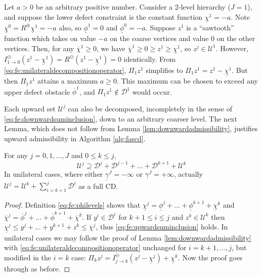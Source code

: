 \documentclass[review,hidelinks,onefignum,onetabnum]{siamart220329}
\newcommand{\maxR}{R^{\bm{\oplus}}}
\newcommand{\minR}{R^{\bm{\ominus}}}
\begin{document}
\begin{example}  \label{ex:notfullcd}
Let $a > 0$ be an arbitrary positive number.  Consider a 2-level hierarchy ($J=1$), and suppose the lower defect constraint is the constant function $\underline{\chi}^1=-a$.  Note $\underline{\chi}^0=\maxR \underline{\chi}^1=-a$ also, so $\underline{\phi}^1=0$ and $\underline{\phi}^0=-a$.  Suppose $z^1$ is a ``sawtooth'' function which takes on value $-a$ on the coarse vertices and value $0$ on the other vertices.  Then, for any $\overline{\chi}^1\ge 0$, we have $\overline{\chi}^1 \ge 0 \ge z^1\ge \underline{\chi}^1$, so $z^j \in \mathcal{U}^1$.  However, $I_{1\to 0}^\ominus(z^1 - \underline{\chi}^1) = \minR(z^1 - \underline{\chi}^1) = 0$ identically.  From \eqref{eq:fe:unilateraldecompositionoperator}, $\Pi_1 z^1$ simplifies to $\Pi_1 z^1 = z^1 - \underline{\chi}^1$.  But then $\Pi_1 z^1$ attains a maximum $a\ge 0$.  This maximum can be chosen to exceed any upper defect obstacle $\overline{\phi}^1$, and $\Pi_1 z^1 \notin \mathcal{D}^1$ would occur.
\end{example}

Each upward set $\mathcal{U}^j$ can also be decomposed, incompletely in the sense of \eqref{eq:fe:downwardsuminclusion}, down to an arbitrary coarser level.  The next Lemma, which does not follow from Lemma \ref{lem:downwardadmissibility}, justifies upward admissibility in Algorithm \ref{alg:fascd}.

\begin{lemma}  \label{lem:upwardadmissibility}  For any $j=0,1,\dots,J$ and $0\le k\le j$,
\begin{equation}
\mathcal{U}^j \supseteq \mathcal{D}^j + \mathcal{D}^{j-1} + \dots + \mathcal{D}^{k+1} + \mathcal{U}^k \label{eq:fe:upwardsuminclusion}
\end{equation}
In unilateral cases, where either $\underline{\gamma}^J=-\infty$ or $\overline{\gamma}^J=+\infty$, actually $\mathcal{U}^j = \mathcal{U}^k + \sum_{i=k+1}^j \mathcal{D}^i$ as a full CD. \end{lemma}

\begin{proof}  Definition \eqref{eq:fe:philevels} shows that $\underline{\chi}^j = \underline{\phi}^j + \dots + \underline{\phi}^{k+1} + \underline{\chi}^k$ and $\overline{\chi}^j = \overline{\phi}^j + \dots + \overline{\phi}^{k+1} + \overline{\chi}^k$.  If $y^i \in \mathcal{D}^i$ for $k+1 \le i \le j$ and $z^k \in \mathcal{U}^k$ then $\underline{\chi}^j \le y^j + \dots + y^{k+1} + z^k \le \overline{\chi}^j$, thus \eqref{eq:fe:upwardsuminclusion} holds.  In unilateral cases we may follow the proof of Lemma \ref{lem:downwardadmissibility} with \eqref{eq:fe:unilateraldecompositionoperator} unchanged for $i=k+1,\dots,j$, but modified in the $i=k$ case: $\Pi_k z^j = I_{j\to k}^\ominus(z^j - \underline{\chi}^j) + \underline{\chi}^k$.  Now the proof goes through as before.
\end{proof}
\end{document}
